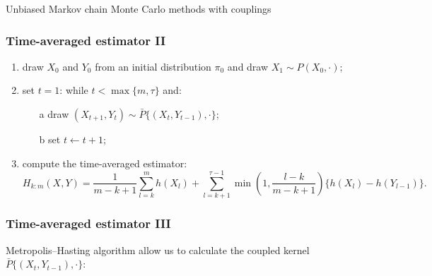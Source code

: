 \documentclass{beamer}
\begin{document}
\begin{section}{Unbiased Markov chain Monte Carlo methods with couplings}
\begin{frame}
	\end{frame}

	\begin{frame}
	 	\frametitle{Time-averaged estimator II}

	 	\begin{enumerate}
	 		\item draw $X_0$ and $Y_0$ from an initial distribution $\pi_0$ and draw $X_1 \sim P(X_0, \cdot)$;
	 		\item set $t=1$: while $t<\max\{m,\tau\}$ and:
	 		\begin{itemize}
	 			\item[a] draw $(X_{t+1}, Y_t)\sim \bar P \{(X_t, Y_{t-1}), \cdot \}$; \only<2>{\textcolor{orange}{$\qquad \bar P$ must be evaluated before!}}
	 			\item[b] set $t \leftarrow t+1$;
	 		\end{itemize}
	 		\item compute the time-averaged estimator:
	 		\footnotesize{	 	$$
	 		H_{k:m}(X,Y)
	 		= \frac{1}{m-k+1}\sum_{l=k}^{m}h(X_l) 
	 		+ \sum_{l=k+1}^{\tau -1}\min(1, \frac{l-k}{m-k+1})\{h(X_l)-h(Y_{l-1})\} .
	 		$$
	 		}

	 	\end{enumerate}
	\end{frame}

	\begin{frame} 	
		\frametitle{Time-averaged estimator III}
	 	Metropolis--Hasting algorithm allow us to calculate the coupled kernel $\bar P \{(X_t, Y_{t-1}), \cdot \}$:
\end{frame}
\end{section}
\end{document}
